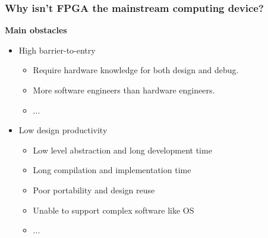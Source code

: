 \documentclass{beamer}
\begin{document}
\begin{frame}[t]

\frametitle{Why isn't FPGA the mainstream computing device?}
\textbf{Main obstacles}
\begin{itemize}

\item High barrier-to-entry
\begin{itemize}
\item Require hardware knowledge for both design and debug.
\item More software engineers than hardware engineers.
\item ...
\end{itemize}

\item Low design productivity
\begin{itemize}
\item Low level abstraction and long development time
\item Long compilation and implementation time
\item Poor portability and design reuse
\item Unable to support complex software like OS
\item ...
\end{itemize}

\end{itemize}

\end{frame}

\end{document}
